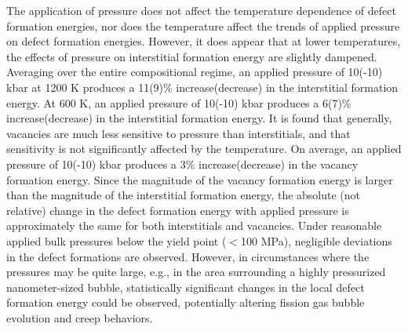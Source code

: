 \documentclass[default]{sn-jnl}%
\begin{document}
The application of pressure does not affect the temperature dependence of defect formation energies, nor does the temperature affect the trends of applied pressure on defect formation energies. However, it does appear that at lower temperatures, the effects of pressure on interstitial formation energy are slightly dampened. Averaging over the entire compositional regime, an applied pressure of 10(-10) kbar at 1200 K produces a 11(9)\% increase(decrease) in the interstitial formation energy. At 600 K, an applied pressure of 10(-10) kbar produces a 6(7)\% increase(decrease) in the interstitial formation energy. It is found that generally, vacancies are much less sensitive to pressure than interstitials, and that sensitivity is not significantly affected by the temperature. On average, an applied pressure of 10(-10) kbar produces a 3\% increase(decrease) in the vacancy formation energy. Since the magnitude of the vacancy formation energy is larger than the magnitude of the interstitial formation energy, the absolute (not relative) change in the defect formation energy with applied pressure is approximately the same for both interstitials and vacancies. Under reasonable applied bulk pressures below the yield point ($<$100 MPa), negligible deviations in the defect formations are observed. However, in circumstances where the pressures may be quite large, e.g., in the area surrounding a highly pressurized nanometer-sized bubble, statistically significant changes in the local defect formation energy could be observed, potentially altering fission gas bubble evolution and creep behaviors.
\end{document}
